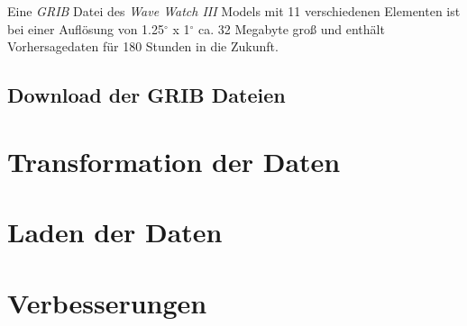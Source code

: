 Eine \textit{GRIB} Datei des \textit{Wave Watch III} Models mit 11
verschiedenen Elementen ist bei einer Auflösung von
1.25$^{\circ}$ x 1$^{\circ}$ ca. 32 Megabyte groß und enthält
Vorhersagedaten für 180 Stunden in die Zukunft.

\subsection{Download der GRIB Dateien}
\label{subsec:download}

\section{Transformation der Daten}
\section{Laden der Daten}
\section{Verbesserungen}

